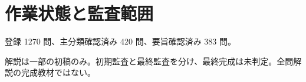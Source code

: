 \chapter{作業状態と監査範囲}
登録 1270 問、主分類確認済み 420 問、要旨確認済み 383 問。
\par 解説は一部の初稿のみ。初期監査と最終監査を分け、最終完成は未判定。全問解説の完成教材ではない。
